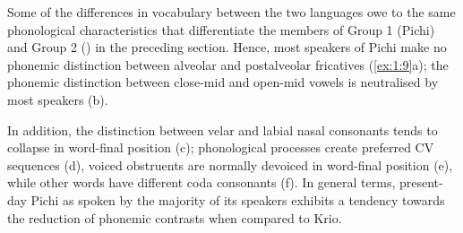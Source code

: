 Some of the differences in vocabulary between the two languages owe to the same phonological characteristics that differentiate the members of Group 1 (Pichi) and Group 2 () in the preceding section. Hence, most speakers of Pichi make no phonemic distinction between alveolar and postalveolar fricatives (\ref{ex:1:9}a); the phonemic distinction between close-mid and open-mid vowels is neutralised by most speakers (b). 

In addition, the distinction between velar and labial nasal consonants tends to collapse in word-final position (c); phonological processes create preferred CV sequences (d), voiced obstruents are normally devoiced in word-final position (e), while other words have different coda consonants (f). In general terms, present-day Pichi as spoken by the majority of its speakers exhibits a tendency towards the reduction of phonemic contrasts when compared to Krio.

